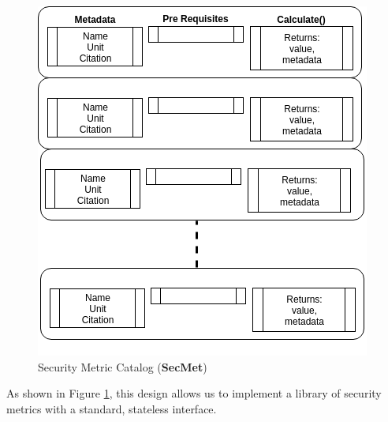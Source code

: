 \begin{figure}[H]
\centering
\includegraphics[width=.5\linewidth]{resource/img/ch_benchmarking/secmet_ptah/SecMet_archs.png}
\caption{Security Metric Catalog (\textbf{SecMet})}
\label{fig:automation:metric_arch}
\end{figure} 

As shown in Figure \ref{fig:automation:metric_arch}, this design allows us to implement a library of security metrics with a standard, stateless interface.




